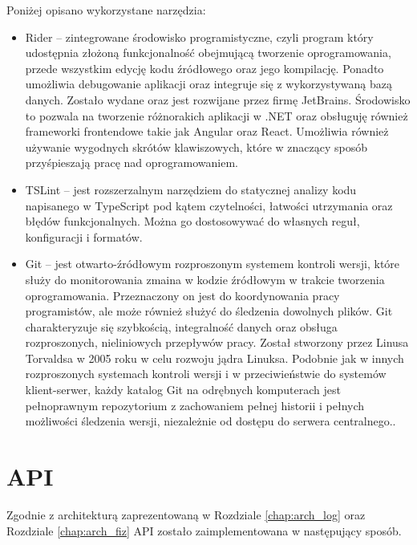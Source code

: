 Poniżej opisano wykorzystane narzędzia:
\begin{itemize}
    \item Rider -- zintegrowane środowisko programistyczne, czyli program który udostępnia złożoną funkcjonalność obejmującą tworzenie oprogramowania, przede wszystkim edycję kodu źródłowego oraz jego kompilację. Ponadto umożliwia debugowanie aplikacji oraz integruje się z wykorzystywaną bazą danych. Zostało wydane oraz jest rozwijane przez firmę JetBrains. Środowisko to pozwala na tworzenie różnorakich aplikacji w .NET oraz obsługuję również frameworki frontendowe takie jak Angular oraz React.\cite{rider} Umożliwia również używanie wygodnych skrótów klawiszowych, które w znaczący sposób przyśpieszają pracę nad oprogramowaniem.
    \item TSLint -- jest rozszerzalnym narzędziem do statycznej analizy kodu napisanego w TypeScript pod kątem czytelności, łatwości utrzymania oraz błędów funkcjonalnych. Można go dostosowywać do własnych reguł, konfiguracji i formatów.\cite{tslint}
    \item Git -- jest otwarto-źródłowym rozproszonym systemem kontroli wersji, które służy do monitorowania zmaina w kodzie źródłowym w trakcie tworzenia oprogramowania. Przeznaczony on jest do koordynowania pracy programistów, ale może również służyć do śledzenia dowolnych plików. Git charakteryzuje się szybkością, integralność danych oraz obsługa rozproszonych, nieliniowych przepływów pracy. Został stworzony przez Linusa Torvaldsa w 2005 roku w celu rozwoju jądra Linuksa. Podobnie jak w innych rozproszonych systemach kontroli wersji i w przeciwieństwie do systemów klient-serwer, każdy katalog Git na odrębnych komputerach jest pełnoprawnym repozytorium z zachowaniem pełnej historii i pełnych możliwości śledzenia wersji, niezależnie od dostępu do serwera centralnego.\cite{git}.
\end{itemize}

\section{API}
Zgodnie z architekturą zaprezentowaną w Rozdziale \ref{chap:arch_log} oraz Rozdziale \ref{chap:arch_fiz} API zostało zaimplementowana w następujący sposób.
